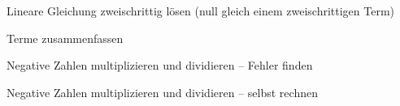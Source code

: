 \begin{aufgabe}{Lineare Gleichung zweischrittig lösen (null gleich einem zweischrittigen Term)}
\end{aufgabe}

\begin{aufgabe}{Terme zusammenfassen}
\end{aufgabe}

\begin{aufgabe}{Negative Zahlen multiplizieren und dividieren – Fehler finden}
\end{aufgabe}

\begin{aufgabe}{Negative Zahlen multiplizieren und dividieren – selbst rechnen}
\end{aufgabe}

